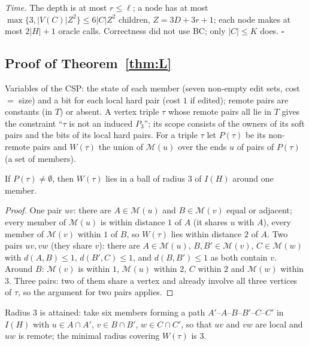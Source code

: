 \emph{Time.} The depth is at most $r\le\ell$; a node has at most $\max\{3,|V(C)|Z^2\}\le6|C|Z^2$ children, $Z=3D+3r+1$; each node makes at most $2|H|+1$ oracle calls. Correctness did not use BC; only $|C|\le K$ does. \hfill$\square$

\subsection{Proof of Theorem~\ref{thm:L}}\label{app:softL}
Variables of the CSP: the state of each member (seven non-empty edit sets, cost $=$ size) and a bit for each local hard pair (cost $1$ if edited); remote pairs are constants (in $T$) or absent. A vertex triple $\tau$ whose remote pairs all lie in $T$ gives the constraint ``$\tau$ is not an induced $P_3$''; its scope consists of the owners of its soft pairs and the bits of its local hard pairs. For a triple $\tau$ let $P(\tau)$ be its non-remote pairs and $W(\tau)$ the union of $\mathcal M(u)$ over the ends $u$ of pairs of $P(\tau)$ (a set of members).
\begin{lemma}\label{lem:triplescope}
If $P(\tau)\ne\emptyset$, then $W(\tau)$ lies in a ball of radius $3$ of $I(H)$ around one member.
\end{lemma}
\begin{proof}
One pair $uv$: there are $A\in\mathcal M(u)$ and $B\in\mathcal M(v)$ equal or adjacent; every member of $\mathcal M(u)$ is within distance $1$ of $A$ (it shares $u$ with $A$), every member of $\mathcal M(v)$ within $1$ of $B$, so $W(\tau)$ lies within distance $2$ of $A$. Two pairs $uv,vw$ (they share $v$): there are $A\in\mathcal M(u)$, $B,B'\in\mathcal M(v)$, $C\in\mathcal M(w)$ with $d(A,B)\le1$, $d(B',C)\le1$, and $d(B,B')\le1$ as both contain $v$. Around $B$: $\mathcal M(v)$ is within $1$, $\mathcal M(u)$ within $2$, $C$ within $2$ and $\mathcal M(w)$ within $3$. Three pairs: two of them share a vertex and already involve all three vertices of $\tau$, so the argument for two pairs applies.
\end{proof}
Radius $3$ is attained: take six members forming a path $A'$--$A$--$B$--$B'$--$C$--$C'$ in $I(H)$ with $u\in A\cap A'$, $v\in B\cap B'$, $w\in C\cap C'$, so that $uv$ and $vw$ are local and $uw$ is remote; the minimal radius covering $W(\tau)$ is $3$.

